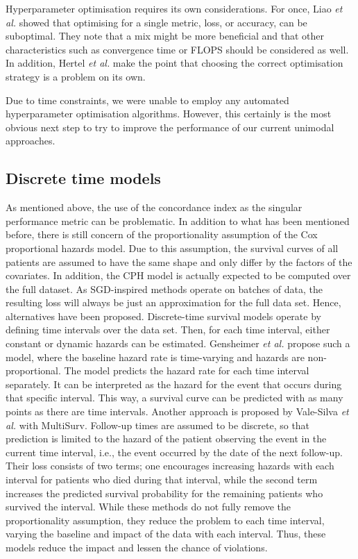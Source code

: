 Hyperparameter optimisation requires its own considerations. For once, Liao \textit{et al.} showed that optimising for a single metric, loss, or accuracy, can be suboptimal. They note that a mix might be more beneficial and that other characteristics such as convergence time or FLOPS should be considered as well. \cite{Liao2022Empirical} In addition, Hertel \textit{et al.} make the point that choosing the correct optimisation strategy is a problem on its own. \cite{Hertel2020Quantity}

Due to time constraints, we were unable to employ any automated hyperparameter optimisation algorithms. However, this certainly is the most obvious next step to try to improve the performance of our current unimodal approaches.

\subsection{Discrete time models}

As mentioned above, the use of the concordance index as the singular performance metric can be problematic. In addition to what has been mentioned before, there is still concern of the proportionality assumption of the Cox proportional hazards model. Due to this assumption, the survival curves of all patients are assumed to have the same shape and only differ by the factors of the covariates. In addition, the CPH model is actually expected to be computed over the full dataset. As SGD-inspired methods operate on batches of data, the resulting loss will always be just an approximation for the full data set. \cite{Gensheimer2019scalable} Hence, alternatives have been proposed. 
Discrete-time survival models operate by defining time intervals over the data set. Then, for each time interval, either constant or dynamic hazards can be estimated. Gensheimer \textit{et al.} propose such a model, where the baseline hazard rate is time-varying and hazards are non-proportional. The model predicts the hazard rate for each time interval separately. It can be interpreted as the hazard for the event that occurs during that specific interval. \cite{Gensheimer2019scalable} This way, a survival curve can be predicted with as many points as there are time intervals.
Another approach is proposed by Vale-Silva \textit{et al.} with MultiSurv. Follow-up times are assumed to be discrete, so that prediction is limited to the hazard of the patient observing the event in the current time interval, i.e., the event occurred by the date of the next follow-up. Their loss consists of two terms; one encourages increasing hazards with each interval for patients who died during that interval, while the second term increases the predicted survival probability for the remaining patients who survived the interval. \cite{ValeSilva2021Long}
While these methods do not fully remove the proportionality assumption, they reduce the problem to each time interval, varying the baseline and impact of the data with each interval. Thus, these models reduce the impact and lessen the chance of violations. 

